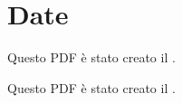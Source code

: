 \documentclass[italian]{article}
\begin{document}
	\section{Date}
Questo PDF è stato creato il \DTMnow.

Questo PDF è stato creato il \DTMnow.
		
	
\end{document}
